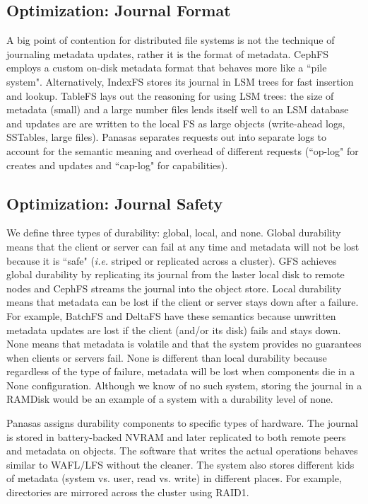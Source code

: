 \subsection{Optimization: Journal Format}

A big point of contention for distributed file systems is not the technique of
journaling metadata updates, rather it is the format of metadata. CephFS
employs a custom on-disk metadata format that behaves more like a ``pile
system". Alternatively, IndexFS stores its journal in LSM trees for fast
insertion and lookup. TableFS lays out the reasoning for using LSM trees: the
size of metadata (small) and a large number files lends itself well to an LSM
database and updates are are written to the local FS as large objects
(write-ahead logs, SSTables, large files). Panasas separates requests out into
separate logs to account for the semantic meaning and overhead of different
requests (``op-log" for creates and updates and ``cap-log" for capabilities).

\subsection{Optimization: Journal Safety}

We define three types of durability: global, local, and none.  Global
durability means that the client or server can fail at any time and metadata
will not be lost because it is ``safe" ({\it i.e.} striped or replicated across
a cluster). GFS achieves global durability by replicating its journal from the
laster local disk to remote nodes and CephFS streams the journal into the
object store. Local durability means that metadata can be lost if the client or
server stays down after a failure. For example, BatchFS and DeltaFS have these
semantics because unwritten metadata updates are lost if the client (and/or its
disk) fails and stays down.  None means that metadata is volatile and that the
system provides no guarantees when clients or servers fail.  None is different
than local durability because regardless of the type of failure, metadata will
be lost when components die in a None configuration. Although we know of no
such system, storing the journal in a RAMDisk would be an example of a system
with a durability level of none.

Panasas assigns durability components to specific types of hardware. The
journal is stored in battery-backed NVRAM and later replicated to both remote
peers and metadata on objects. The software that writes the actual operations
behaves similar to WAFL/LFS without the cleaner. The system also stores
different kids of metadata (system vs. user, read vs. write) in different
places. For example, directories are mirrored across the cluster using RAID1.

